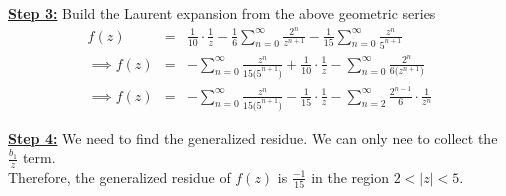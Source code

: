 \documentclass[12pt]{report}
\newcommand{\ubt}[1]{\textbf{\underline{#1}}}
\newcommand{\sps}{\\[0.2cm]}
\newcommand{\dsp}{\displaystyle}
\newcommand{\NI}{\noindent}
\begin{document}
	\NI\ubt{Step 3:} Build the Laurent expansion from the above geometric series
	\begin{eqnarray*}
		f(z) &=& \frac{1}{10}\cdot \frac{1}{z} - \frac{1}{6}\sum_{n=0}^{\infty}\frac{2^n}{z^{n+1}} - \frac{1}{15}\sum_{n=0}^{\infty}\frac{z^n}{5^{n+1}}\sps
		\implies f(z) &=& - \sum_{n=0}^{\infty}\frac{z^n}{15\big(5^{n+1}\big)} + \frac{1}{10}\cdot\frac{1}{z} - \sum_{n=0}^{\infty}\frac{2^n}{6\big(z^{n+1}\big)}\sps
		\implies f(z) &=& -\sum_{n=0}^{\infty}\frac{z^n}{15\big(5^{n+1}\big)} - \frac{1}{15}\cdot\frac{1}{z} - \sum_{n=2}^{\infty}\frac{2^{n-1}}{6}\cdot \frac{1}{z^n}
	\end{eqnarray*}
	
	\NI\ubt{Step 4:} We need to find the generalized residue. We can only nee to collect the $\dsp\frac{b_1}{z}$ term.\\
	Therefore, the generalized residue of $f(z)$ is $\dsp\frac{-1}{15}$ in the region $2<|z|<5$.
	
\end{document}
